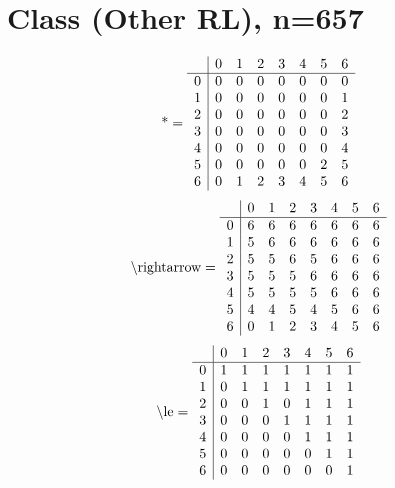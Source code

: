 \documentclass[11pt]{article}
\begin{document}
\section{Class (Other RL), n=657}
\[\text{*} = 
\begin{array}{r | r r r r r r r}
 & 0 & 1 & 2 & 3 & 4 & 5 & 6 \\ \hline
0 & 0 & 0 & 0 & 0 & 0 & 0 & 0 \\
1 & 0 & 0 & 0 & 0 & 0 & 0 & 1 \\
2 & 0 & 0 & 0 & 0 & 0 & 0 & 2 \\
3 & 0 & 0 & 0 & 0 & 0 & 0 & 3 \\
4 & 0 & 0 & 0 & 0 & 0 & 0 & 4 \\
5 & 0 & 0 & 0 & 0 & 0 & 2 & 5 \\
6 & 0 & 1 & 2 & 3 & 4 & 5 & 6 \\
\end{array}
\]
\[\text{\textbackslash rightarrow} = 
\begin{array}{r | r r r r r r r}
 & 0 & 1 & 2 & 3 & 4 & 5 & 6 \\ \hline
0 & 6 & 6 & 6 & 6 & 6 & 6 & 6 \\
1 & 5 & 6 & 6 & 6 & 6 & 6 & 6 \\
2 & 5 & 5 & 6 & 5 & 6 & 6 & 6 \\
3 & 5 & 5 & 5 & 6 & 6 & 6 & 6 \\
4 & 5 & 5 & 5 & 5 & 6 & 6 & 6 \\
5 & 4 & 4 & 5 & 4 & 5 & 6 & 6 \\
6 & 0 & 1 & 2 & 3 & 4 & 5 & 6 \\
\end{array}
\]
\[\text{\textbackslash le} = 
\begin{array}{r | r r r r r r r}
 & 0 & 1 & 2 & 3 & 4 & 5 & 6 \\ \hline
0 & 1 & 1 & 1 & 1 & 1 & 1 & 1 \\
1 & 0 & 1 & 1 & 1 & 1 & 1 & 1 \\
2 & 0 & 0 & 1 & 0 & 1 & 1 & 1 \\
3 & 0 & 0 & 0 & 1 & 1 & 1 & 1 \\
4 & 0 & 0 & 0 & 0 & 1 & 1 & 1 \\
5 & 0 & 0 & 0 & 0 & 0 & 1 & 1 \\
6 & 0 & 0 & 0 & 0 & 0 & 0 & 1 \\
\end{array}
\]
\end{document}
